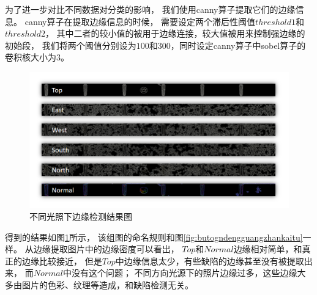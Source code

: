 为了进一步对比不同数据对分类的影响，
我们使用canny\cite{canny1983finding}算子提取它们的边缘信息。
canny算子在提取边缘信息的时候，
需要设定两个滞后性阈值$threshold1$和$threshold2$，
其中二者的较小值的被用于边缘连接，较大值被用来控制强边缘的初始段，
我们将两个阈值分别设为$100$和$300$，同时设定canny算子中sobel算子的卷积核大小为$3$。
\begin{figure}[htbp]
\centering
\includegraphics[width=1.0\linewidth]{figures/butongdengguangcanny.png}
\caption{不同光照下边缘检测结果图}
\label{fig:butongdengguangcanny}
\end{figure}
得到的结果如图\ref{fig:butongdengguangcanny}所示，
该组图的命名规则和图\ref{fig:butogndengguangzhankaitu}一样。
从边缘提取图片中的边缘密度可以看出，
$Top$和$Normal$边缘相对简单，和真正的边缘比较接近，
但是$Top$中边缘信息太少，有些缺陷的边缘甚至没有被提取出来，
而$Normal$中没有这个问题；
不同方向光源下的照片边缘过多，这些边缘大多由图片的色彩、纹理等造成，和缺陷检测无关。


